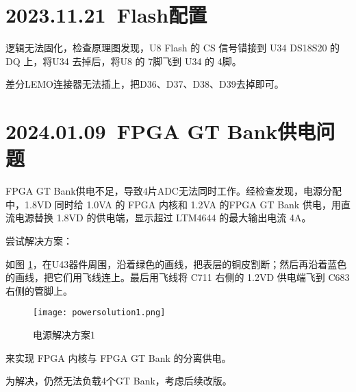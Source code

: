 \section{2023.11.21~Flash配置}
逻辑无法固化，检查原理图发现，U8 Flash 的 CS 信号错接到 U34 DS18S20 的 DQ 上，将U34 去掉后，将U8 的 7脚飞到 U34 的 4脚。\par
差分LEMO连接器无法插上，把D36、D37、D38、D39去掉即可。


\section{2024.01.09~FPGA GT Bank供电问题}
FPGA GT Bank供电不足，导致4片ADC无法同时工作。经检查发现，电源分配中，1.8VD 同时给 1.0VA 的 FPGA 内核和 1.2VA 的FPGA GT Bank 供电，用直流电源替换 1.8VD 的供电端，显示超过 LTM4644 的最大输出电流 4A。\par
尝试解决方案：\par
如图 \ref{fig:powersolution1}，在U43器件周围，沿着绿色的画线，把表层的铜皮割断；然后再沿着蓝色的画线，把它们用飞线连上。最后用飞线将 C711 右侧的 1.2VD 供电端飞到 C683 右侧的管脚上。\par
\begin{figure}[htbp]
  \centering
  \texttt{[image: powersolution1.png]}
  \caption{电源解决方案1}
  \label{fig:powersolution1}
\end{figure}
来实现 FPGA 内核与 FPGA GT Bank 的分离供电。\par
为解决，仍然无法负载4个GT Bank，考虑后续改版。\par

